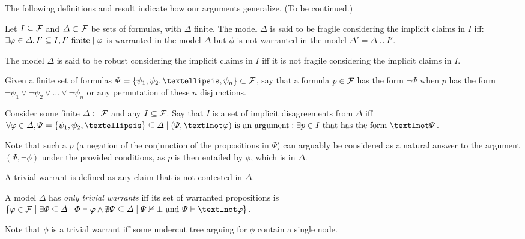 \documentclass[version=3.21, pagesize, twoside=off, bibliography=totoc, DIV=calc, fontsize=12pt, a4paper, french, english]{scrartcl}
\begin{document}
The following definitions and result indicate how our arguments generalize. (To be continued.)
\begin{definition}
	Let $I \subseteq \mathcal{F}$ and $\Delta \subset \mathcal{F}$ be sets of formulas, with $\Delta$ finite. The model $\Delta$ is said to be fragile considering the implicit claims in $I$ iff: $\exists \phi \in \Delta, I' \subseteq I, I' \text{ finite} \suchthat \phi$ is warranted in the model $\Delta$ but $\phi$ is not warranted in the model $\Delta' = \Delta \cup I'$.
	
	The model $\Delta$ is said to be robust considering the implicit claims in $I$ iff it is not fragile considering the implicit claims in $I$.
\end{definition}
\begin{definition}
	Given a finite set of formulas $\Psi = \set{\psi_1, \psi_2, …, \psi_n} \subset \allformulas$, say that a formula $p \in \mathcal{F}$ has the form $¬\Psi$ when $p$ has the form $¬\psi_1 \lor ¬\psi_2 \lor … \lor ¬\psi_n$ or any permutation of these $n$ disjunctions.
	
	Consider some finite $\Delta \subset \mathcal{F}$ and any $I \subseteq \mathcal{F}$. Say that $I$ is a set of implicit disagreements from $\Delta$ iff $\forall \phi \in \Delta, \Psi = \set{\psi_1, \psi_2, …} \subseteq \Delta \suchthat (\Psi, ¬\phi) \text{ is an argument}: \exists p \in I \text{ that has the form } ¬\Psi$.
\end{definition}
Note that such a $p$ (a negation of the conjunction of the propositions in $\Psi$) can arguably be considered as a natural answer to the argument $(\Psi, ¬\phi)$ under the provided conditions, as $p$ is then entailed by $\phi$, which is in $\Delta$.

A trivial warrant is defined as any claim that is not contested in $\Delta$.
\begin{definition}
	A model $\Delta$ has \emph{only trivial warrants} iff its set of warranted propositions is $\set{\phi \in \allformulas \suchthat \exists \Phi \subseteq \Delta \suchthat \Phi \vdash \phi \land \nexists \Psi \subseteq \Delta \suchthat \Psi \nvdash \bot \text{ and } \Psi \vdash ¬\phi}$.
\end{definition}
Note that $\phi$ is a trivial warrant iff some undercut tree arguing for $\phi$ contain a single node.
\end{document}
